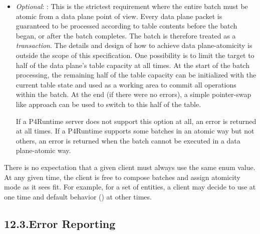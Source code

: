 \documentclass[11pt]{article}
\begin{document}
{\begin{itemize}
\item{}
\emph{Optional}: : This is the strictest requirement where the
entire batch must be atomic from a data plane point of view. Every data plane
packet is guaranteed to be processed according to table contents before the
batch began, or after the batch completes. The batch is therefore treated as a
\emph{transaction}. The details and design of how to achieve data plane-atomicity
is outside the scope of this specification. One possibility is to limit the
target to half of the data plane's table capacity at all times. At the start
of the batch processing, the remaining half of the table capacity can be
initialized with the current table state and used as a working area to commit
all operations within the batch. At the end (if there were no errors), a
simple pointer-swap like approach can be used to switch to this half of the
table.%

If a P4Runtime server does not support this option at all, an 
error is returned at all times. If a P4Runtime supports some batches in an
atomic way but not others, an  error is returned when the batch
cannot be executed in a data plane-atomic way.%
\end{itemize}%

\noindent{}There is no expectation that a given client must always use the same 
enum value. At any given time, the client is free to compose batches and assign
atomicity mode as it sees fit. For example, for a set of entities, a client may
decide to use  at one time and default behavior
() at other times.%

\subsection{12.3.\hspace*{0.5em}Error Reporting}\label{sec-error-reporting}%

}
\end{document}
